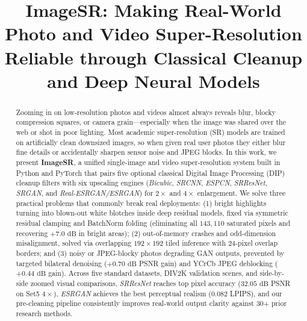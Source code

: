 \documentclass[10pt,onecolumn,journal]{IEEEtran}
\begin{document}
\title{ImageSR: Making Real-World Photo and Video Super-Resolution Reliable through Classical Cleanup and Deep Neural Models}

\author{}

\maketitle

\begin{abstract}
Zooming in on low-resolution photos and videos almost always reveals blur, blocky compression squares, or camera grain---especially when the image was shared over the web or shot in poor lighting. Most academic super-resolution (SR) models are trained on artificially clean downsized images, so when given real user photos they either blur fine details or accidentally sharpen sensor noise and JPEG blocks. In this work, we present \textbf{ImageSR}, a unified single-image and video super-resolution system built in Python and PyTorch that pairs five optional classical Digital Image Processing (DIP) cleanup filters with six upscaling engines (\textit{Bicubic}, \textit{SRCNN}, \textit{ESPCN}, \textit{SRResNet}, \textit{SRGAN}, and \textit{Real-ESRGAN/ESRGAN}) for $2\times$ and $4\times$ enlargement. We solve three practical problems that commonly break real deployments: (1) bright highlights turning into blown-out white blotches inside deep residual models, fixed via symmetric residual clamping and BatchNorm folding (eliminating all $143{,}110$ saturated pixels and recovering $+7.0\text{ dB}$ in bright areas); (2) out-of-memory crashes and odd-dimension misalignment, solved via overlapping $192\times192$ tiled inference with $24$-pixel overlap borders; and (3) noisy or JPEG-blocky photos degrading GAN outputs, prevented by targeted bilateral denoising ($+0.70\text{ dB}$ PSNR gain) and YCrCb JPEG deblocking ($+0.44\text{ dB}$ gain). Across five standard datasets, DIV2K validation scenes, and side-by-side zoomed visual comparisons, \textit{SRResNet} reaches top pixel accuracy ($32.05\text{ dB}$ PSNR on Set5 $4\times$), \textit{ESRGAN} achieves the best perceptual realism ($0.082$ LPIPS), and our pre-cleaning pipeline consistently improves real-world output clarity against 30+ prior research methods.
\end{abstract}
\end{document}
